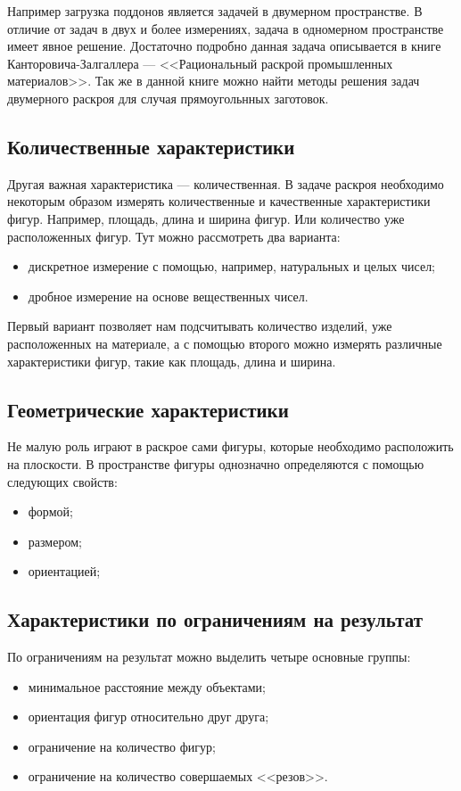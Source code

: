 \documentclass[14pt]{extarticle}
\begin{document}
	Например загрузка поддонов является задачей в двумерном пространстве. В отличие от 	задач в двух и более измерениях, задача в одномерном пространстве имеет явное решение. Достаточно подробно данная задача описывается в книге \cite{Cantorovich} Канторовича-Залгаллера --- <<Рациональный раскрой промышленных материалов>>. Так же в данной книге можно найти методы решения задач двумерного раскроя для случая прямоугольнных заготовок.
	\subsection{Количественные характеристики}
	Другая важная характеристика --- количественная. В задаче раскроя необходимо
	некоторым образом измерять количественные и качественные характеристики фигур.
	Например, площадь, длина и ширина фигур. Или количество уже расположенных фигур. Тут можно рассмотреть два варианта:
	\begin{itemize}
		\item дискретное измерение с помощью, например, натуральных и целых чисел;
		\item дробное измерение на основе вещественных чисел.
	\end{itemize}


	Первый вариант позволяет нам подсчитывать количество изделий, уже расположенных
	на материале, а с помощью второго можно измерять различные характеристики фигур, 	такие как площадь, длина и ширина.
	\subsection{Геометрические характеристики}
	Не малую роль играют в раскрое сами фигуры, которые необходимо расположить
	на плоскости. В пространстве фигуры однозначно определяются с помощью следующих
	свойств:
	\begin{itemize}
		\item формой;
		\item размером;
		\item ориентацией;
	\end{itemize}
	\subsection{Характеристики по ограничениям на результат}
	По ограничениям на результат можно выделить четыре основные группы:
	\begin{itemize}
		\item  минимальное расстояние между объектами;
		\item ориентация фигур относительно друг друга;
		\item ограничение на количество фигур;
		\item ограничение на количество совершаемых <<резов>>.
	\end{itemize}
\end{document}

